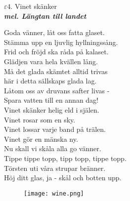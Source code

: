 \documentclass[a6paper,10pt]{article}
\newcommand{\mel}[1]{\small\textbf{\textit{mel. #1 \\}}}
\begin{document}
\setlength{\oddsidemargin}{-0.47in}
\noindent
\begin{center}
\Large $\varepsilon4$. Vinet skänker \\ 
\mel{Längtan till landet}
\end{center}
Goda vänner, låt oss fatta glaset.\\
Stämma upp en ljuvlig hyllningssång.\\
Frid och fröjd ska råda på kalaset.\\
Glädjen vara hela kvällen lång.
\vspace{5pt}\\
Må det glada skämtet alltid trivas\\
här i detta sällskaps glada lag.\\
Låtom oss av druvans safter livas -\\
Spara vatten till en annan dag!
\vspace{5pt}\\
Vinet skänker helig eld i själen.\\
Vinet rosar som en sky.\\
Vinet lossar varje band på trälen.\\
Vinet gör en mänska ny.
\vspace{5pt}\\
Nu skall vi skåla alla go vänner.\\
Tippe tippe topp, tipp topp, tippe topp.\\
Törsten uti våra strupar bränner.\\
Höj ditt glas, ja - skål och botten upp. 
\begin{figure}[!h]
\hfill
\texttt{[image: wine.png]}
\end{figure}
\end{document}
